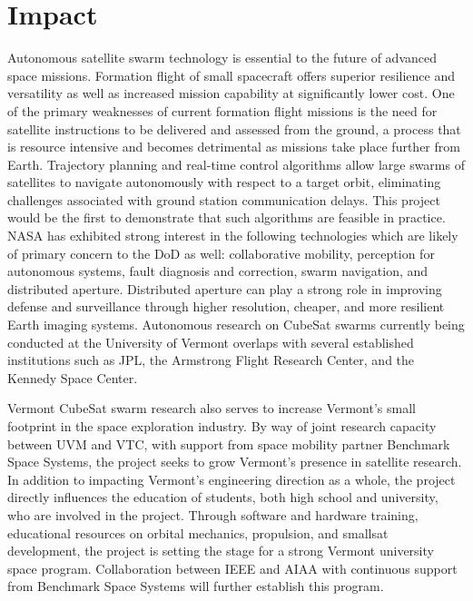 \section{Impact}
Autonomous satellite swarm technology is essential to the future of
advanced space missions. Formation flight of small spacecraft offers
superior resilience and versatility as well as increased mission
capability at significantly lower cost. One of the primary weaknesses
of current formation flight missions is the need for satellite
instructions to be delivered and assessed from the ground, a process
that is resource intensive and becomes detrimental as missions take
place further from Earth. Trajectory planning and real-time control
algorithms allow large swarms of satellites to navigate autonomously
with respect to a target orbit, eliminating challenges associated with
ground station communication delays. This project would be the first
to demonstrate that such algorithms are feasible in practice. NASA has
exhibited strong interest in the following technologies which are
likely of primary concern to the DoD as well: collaborative mobility,
perception for autonomous systems, fault diagnosis and correction,
swarm navigation, and distributed aperture. Distributed aperture can
play a strong role in improving defense and surveillance through
higher resolution, cheaper, and more resilient Earth imaging
systems. Autonomous research on CubeSat swarms currently being
conducted at the University of Vermont overlaps with several
established institutions such as JPL, the Armstrong Flight Research
Center, and the Kennedy Space Center. 

Vermont CubeSat swarm research also serves to increase Vermont’s small
footprint in the space exploration industry. By way of joint research
capacity between UVM and VTC, with support from space mobility partner
Benchmark Space Systems, the project seeks to grow Vermont’s presence
in satellite research. In addition to impacting Vermont’s engineering
direction as a whole, the project directly influences the education of
students, both high school and university, who are involved in the
project. Through software and hardware training, educational resources
on orbital mechanics, propulsion, and smallsat development, the
project is setting the stage for a strong Vermont university space
program. Collaboration between IEEE and AIAA with continuous support
from Benchmark Space Systems will further establish this program.

